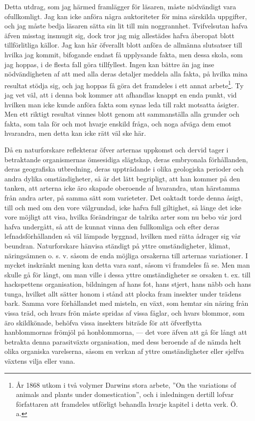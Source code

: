 Detta utdrag, som jag härmed framlägger för läsaren, måste nödvändigt vara ofullkomligt. Jag kan icke anföra några auktoriteter för mina särskilda uppgifter, och jag måste bedja läsaren sätta sin lit till min noggrannhet. Tvifvelsutan hafva äfven misstag insmugit sig, dock tror jag mig allestädes hafva åberopat blott tillförlitliga källor. Jag kan här öfverallt blott anföra de allmänna slutsatser till hvilka jag kommit, bifogande endast få upplysande fakta, men dessa skola, som jag hoppas, i de flesta fall göra tillfyllest. Ingen kan bättre än jag inse nödvändigheten af att med alla deras detaljer meddela alla fakta, på hvilka mina resultat stödja sig, och jag hoppas få göra det framdeles i ett annat arbete\footnote{År 1868 utkom i två volymer Darwins stora arbete, ”On the variations of animals and plants under domestication”, och i inledningen dertill lofvar författaren att framdeles utförligt behandla hvarje kapitel i detta verk.
Ö. a.}. Ty jag vet väl, att i denna bok kommer att afhandlas knappt en enda punkt, vid hvilken man icke kunde anföra fakta som synas leda till rakt motsatta åsigter. Men ett riktigt resultat vinnes blott genom att sammanställa alla grunder och fakta, som tala för och mot hvarje enskild fråga, och noga afväga dem emot hvarandra, men detta kan icke rätt väl ske här.

Då en naturforskare reflekterar öfver arternas uppkomst och der\-vid tager i betraktande organismernas ömsesidiga slägtskap, deras embryonala förhållanden, deras geografiska utbredning, deras uppträdande i olika geologiska perioder och andra dylika omständigheter, så är det lätt begripligt, att han kommer på den tanken, att arterna icke äro skapade oberoende af hvarandra, utan härstamma från andra arter, på samma sätt som varieteter. Det oaktadt torde denna åsigt, till och med om den vore välgrundad, icke hafva full giltighet, så länge det icke vore möjligt att visa, hvilka förändringar de talrika arter som nu bebo vår jord hafva undergått, så att de kunnat vinna den fullkomliga och efter deras lefnadsförhållanden så väl lämpade byggnad, hvilken med rätta ådrager sig vår beundran. Naturforskare hänvisa ständigt på yttre omständigheter, klimat, näringsämnen o. s. v. såsom de enda möjliga orsakerna till arternas variationer. I mycket inskränkt mening kan detta vara sant, såsom vi framdeles få se. Men man skulle gå för långt, om man ville i dessa yttre omständigheter se orsaken t. ex. till hackspettens organisation, bildningen af hans fot, hans stjert, hans näbb och hans tunga, hvilket allt sätter honom i stånd att plocka fram insekter under trädens bark. Samma vore förhållandet med misteln, en växt, som hemtar sin näring från vissa träd, och hvars frön måste spridas af vissa fåglar, och hvars blommor, som äro skildkönade, behöfva vissa insekters biträde för att öfverflytta hanblommornas frömjöl på honblommorna, — det vore äfven att gå för långt att betrakta denna parasitväxts organisation, med dess beroende af de nämda helt olika organiska varelserna, såsom en verkan af yttre omständigheter eller sjelfva växtens vilja eller vana.

